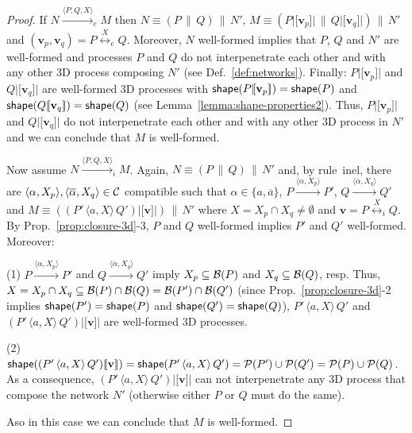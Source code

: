 \documentclass[11pt]{article}
\newcommand{\lsbrace}{\ensuremath{|\![}}
\newcommand{\rsbrace}{\ensuremath{]\!|}}
\newcommand{\vect}[1]{\mathbf{#1}}
\newcommand{\channels}{{\cal C}}
\newcommand{\unionc}[1]{\,\langle #1 \rangle\,}
\newcommand{\nar}[1]{\xrightarrow{#1}}
\newcommand{\enar}[1]{\xrightarrow{#1}_{e}}
\newcommand{\inar}[1]{\xrightarrow{#1}_{i}}
\def\name#1{\mbox{\sc #1}}
\newcommand{\collision}[2]{\stackrel{{#1}}{\longleftrightarrow}_{#2}}
\newcommand{\shape}{{\sf shape}}
\newcommand{\boundary}[1]{\ensuremath{{\cal B}(#1)}}
\newcommand{\points}[1]{\ensuremath{{\cal P}(#1)}}
\begin{document}
\par\medskip\noindent \begin{proof}
If  $N \enar{\langle P, Q, X \rangle} M$  then $N \equiv (P \,\|\, Q) \,\|\, N'$, $M \equiv  (P
\lsbrace \vect{v}_p\rsbrace \,\|\, Q\lsbrace \vect{v}_q \rsbrace) \,\|\, N'$ and $(\vect{v}_p,
\vect{v}_q) = P \collision{X}{e} Q$. Moreover, $N$ well-formed implies that $P$, $Q$ and $N'$ are
well-formed and processes $P$ and $Q$ do not interpenetrate each other and with any other 3D process
composing $N'$ (see Def.~\ref{def:networks}).
Finally:  $P \lsbrace \vect{v}_p\rsbrace$ and $Q\lsbrace \vect{v}_q
\rsbrace$ are well-formed 3D processes with $\shape(P \lsbrace \vect{v}_p\rsbrace) = \shape(P)$ and
$\shape(Q\lsbrace \vect{v}_q \rsbrace) = \shape(Q)$ (see Lemma~\ref{lemma:shape-properties2}).
Thus, $P\lsbrace \vect{v}_p \rsbrace$ and $Q\lsbrace \vect{v}_q \rsbrace$ do not interpenetrate
each other and with any other 3D process in $N'$ and we can conclude that $M$ is well-formed.

\par\medskip\noindent Now assume $N \inar{\langle P, Q, X \rangle} M$. Again, $N \equiv (P \,\|\, Q)
\,\|\, N'$ and, by rule~\name{inel},  there
are $\langle \alpha, X_p\rangle, \langle \overline{\alpha}, X_q \rangle \in \channels$ compatible
such that $\alpha \in \{a,\overline{a}\}$, $P \nar{\langle \alpha, X_p\rangle} P'$, $Q \nar{\langle
\overline{\alpha}, X_q \rangle} Q'$ and $M \equiv  ((P' \unionc{a,X} Q') \lsbrace \vect{v} \rsbrace)
\,\|\, N'$ where $X = X_p \cap X_q \neq \emptyset$ and $\vect{v} = P \collision{X}{i} Q $. By
Prop.~\ref{prop:closure-3d}-3, $P$ and $Q$ well-formed implies  $P'$ and $Q'$ well-formed. Moreover:

\par\smallskip\noindent (1) $P \nar{\langle \alpha, X_p\rangle} P'$ and $Q \nar{\langle
\overline{\alpha}, X_q \rangle} Q'$ imply $X_p \subseteq \boundary{P}$ and $X_q \subseteq
\boundary{Q}$, resp. Thus, $X = X_p \cap X_q \subseteq \boundary{P} \cap \boundary{Q} =
\boundary{P'} \cap \boundary{Q'}$ (since Prop.~\ref{prop:closure-3d}-2 implies
$\shape(P')= \shape(P)$ and $\shape(Q')= \shape(Q)$), $P' \unionc{a,X} Q'$ and $(P' \unionc{a,X} Q')
\lsbrace \vect{v} \rsbrace$ are well-formed 3D processes.

\par\smallskip\noindent (2) $\shape((P' \unionc{a,X} Q') \lsbrace \vect{v} \rsbrace) =
\shape(P' \unionc{a,X} Q') = \points{P'} \cup \points{Q'} = \\
\points{P} \cup \points{Q}$. As a consequence, $(P' \unionc{a,X} Q') \lsbrace \vect{v} \rsbrace$ can
not interpenetrate any 3D process that compose the network $N'$ (otherwise either $P$ or $Q$ must
do the same).

\par\medskip\noindent Aso in this case we can conclude that $M$ is well-formed.
\end{proof}
\end{document}
